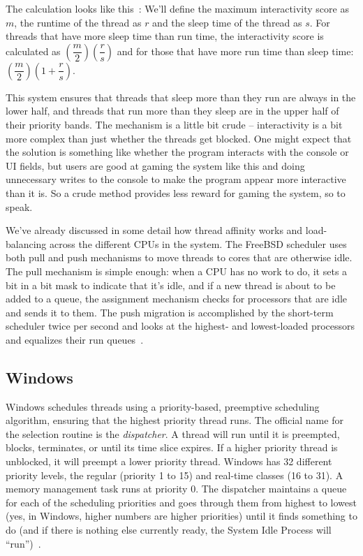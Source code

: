 The calculation looks like this~\cite{osi}: We'll define the maximum interactivity score as $m$, the runtime of the thread as $r$ and the sleep time of the thread as $s$. For threads that have more sleep time than run time, the interactivity score is calculated as $(\dfrac{m}{2})(\dfrac{r}{s})$ and for those that have more run time than sleep time:
  $(\dfrac{m}{2})(1 + \dfrac{r}{s})$. 
  
This system ensures that threads that sleep more than they run are always in the lower half, and threads that run more than they sleep are in the upper half of their priority bands. The mechanism is a little bit crude -- interactivity is a bit more complex than just whether the threads get blocked. One might expect that the solution is something like whether the program interacts with the console or UI fields, but users are good at gaming the system like this and doing unnecessary writes to the console to make the program appear more interactive than it is. So a crude method provides less reward for gaming the system, so to speak.

We've already discussed in some detail how thread affinity works and load-balancing across the different CPUs in the system. The FreeBSD scheduler uses both pull and push mechanisms to move threads to cores that are otherwise idle. The pull mechanism is simple enough: when a CPU has no work to do, it sets a bit in a bit mask to indicate that it's idle, and if a new thread is about to be added to a queue, the assignment mechanism checks for processors that are idle and sends it to them. The push migration is accomplished by the short-term scheduler twice per second and looks at the highest- and lowest-loaded processors and equalizes their run queues~\cite{osi}. 

\subsection*{Windows}

Windows schedules threads using a priority-based, preemptive scheduling algorithm, ensuring that the highest priority thread runs. The official name for the selection routine is the \textit{dispatcher}. A thread will run until it is preempted, blocks, terminates, or until its time slice expires. If a higher priority thread is unblocked, it will preempt a lower priority thread. Windows has 32 different priority levels, the regular (priority 1 to 15) and real-time classes (16 to 31). A memory management task runs at priority 0. The dispatcher maintains a queue for each of the scheduling priorities and goes through them from highest to lowest (yes, in Windows, higher numbers are higher priorities) until it finds something to do (and if there is nothing else currently ready, the System Idle Process will ``run'')~\cite{osc}.

